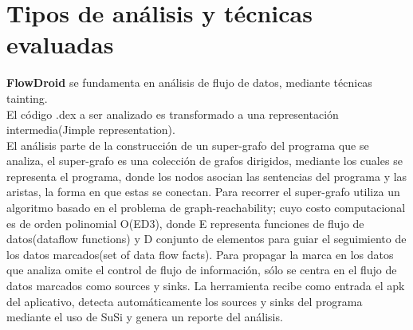 \section{Tipos de análisis y técnicas evaluadas}
\label{sec:compare}
\textbf{FlowDroid} se fundamenta en análisis de flujo de datos, mediante
técnicas tainting.\\
El código .dex a ser analizado es transformado a una representación
intermedia(Jimple representation).\\
El análisis parte de la construcción de un super-grafo del programa que se
analiza, el super-grafo es una colección de grafos dirigidos, mediante los
cuales se representa el programa, donde los nodos asocian las sentencias del
programa y las aristas, la forma en que estas se conectan. Para recorrer el
super-grafo utiliza un algoritmo basado en el problema de
graph-reachability\cite{Graph-reachability}; cuyo costo computacional es de
orden polinomial O(ED3), donde E representa funciones de flujo de datos(dataflow
functions) y D conjunto de elementos para guiar el seguimiento de los
datos marcados(set of data flow facts).\newline
Para propagar la marca en los datos que analiza omite el control de flujo de
información, sólo se centra en el flujo de datos marcados como sources y
sinks.\newline
La herramienta recibe como entrada el apk del aplicativo, detecta
automáticamente los sources y sinks del programa mediante el uso de SuSi y
genera un reporte del análisis.

